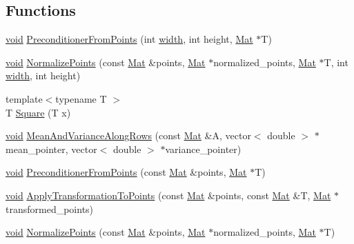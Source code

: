 \subsection*{Functions}
\begin{DoxyCompactItemize}
\item 
\hyperlink{png_8h_aa8c59027f9ab2769342f248709d68d17}{void} \hyperlink{namespaceorsa_a05e1c628ae168c7e05e52104275198ab}{Preconditioner\+From\+Points} (int \hyperlink{png_8h_ad46179dbe9c68fdcea52b34c3480ec0f}{width}, int height, \hyperlink{namespaceorsa_a313ec0d31d0828c8410a7f348a5e5263}{Mat} $\ast$T)
\item 
\hyperlink{png_8h_aa8c59027f9ab2769342f248709d68d17}{void} \hyperlink{namespaceorsa_a6b5299dc61d20ea4a832f8d5f5d05421}{Normalize\+Points} (const \hyperlink{namespaceorsa_a313ec0d31d0828c8410a7f348a5e5263}{Mat} \&points, \hyperlink{namespaceorsa_a313ec0d31d0828c8410a7f348a5e5263}{Mat} $\ast$normalized\+\_\+points, \hyperlink{namespaceorsa_a313ec0d31d0828c8410a7f348a5e5263}{Mat} $\ast$T, int \hyperlink{png_8h_ad46179dbe9c68fdcea52b34c3480ec0f}{width}, int height)
\item 
{\footnotesize template$<$typename T $>$ }\\T \hyperlink{namespaceorsa_af58082598412906fb626a2995edacb16}{Square} (T x)
\item 
\hyperlink{png_8h_aa8c59027f9ab2769342f248709d68d17}{void} \hyperlink{namespaceorsa_a4f88c1cb34bb8688722c3e7d8ef41a8d}{Mean\+And\+Variance\+Along\+Rows} (const \hyperlink{namespaceorsa_a313ec0d31d0828c8410a7f348a5e5263}{Mat} \&A, vector$<$ double $>$ $\ast$mean\+\_\+pointer, vector$<$ double $>$ $\ast$variance\+\_\+pointer)
\item 
\hyperlink{png_8h_aa8c59027f9ab2769342f248709d68d17}{void} \hyperlink{namespaceorsa_a5a65641df90c8a53ffc7687ae3c5a01b}{Preconditioner\+From\+Points} (const \hyperlink{namespaceorsa_a313ec0d31d0828c8410a7f348a5e5263}{Mat} \&points, \hyperlink{namespaceorsa_a313ec0d31d0828c8410a7f348a5e5263}{Mat} $\ast$T)
\item 
\hyperlink{png_8h_aa8c59027f9ab2769342f248709d68d17}{void} \hyperlink{namespaceorsa_a87aaec1245eeedd272c37cd75c60788d}{Apply\+Transformation\+To\+Points} (const \hyperlink{namespaceorsa_a313ec0d31d0828c8410a7f348a5e5263}{Mat} \&points, const \hyperlink{namespaceorsa_a313ec0d31d0828c8410a7f348a5e5263}{Mat} \&T, \hyperlink{namespaceorsa_a313ec0d31d0828c8410a7f348a5e5263}{Mat} $\ast$transformed\+\_\+points)
\item 
\hyperlink{png_8h_aa8c59027f9ab2769342f248709d68d17}{void} \hyperlink{namespaceorsa_a48cde20bdcad49a4e39730ccb995e6ec}{Normalize\+Points} (const \hyperlink{namespaceorsa_a313ec0d31d0828c8410a7f348a5e5263}{Mat} \&points, \hyperlink{namespaceorsa_a313ec0d31d0828c8410a7f348a5e5263}{Mat} $\ast$normalized\+\_\+points, \hyperlink{namespaceorsa_a313ec0d31d0828c8410a7f348a5e5263}{Mat} $\ast$T)

\end{DoxyCompactItemize}
